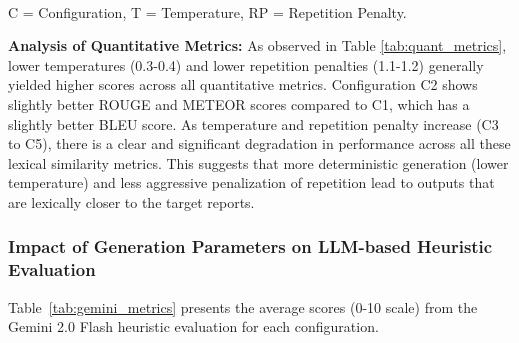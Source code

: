 \documentclass[fleqn,moreauthors,10pt]{ds_report}
\begin{document}
\begin{table*}[!tbp]
\centering
\caption{Average Quantitative Metrics for Different Generation Configurations}
\label{tab:quant_metrics}
\footnotesize{\\C = Configuration, T = Temperature, RP = Repetition Penalty.}
\end{table*}

\textbf{Analysis of Quantitative Metrics:}
As observed in Table \ref{tab:quant_metrics}, lower temperatures (0.3-0.4) and lower repetition penalties (1.1-1.2) generally yielded higher scores across all quantitative metrics. Configuration C2 shows slightly better ROUGE and METEOR scores compared to C1, which has a slightly better BLEU score. As temperature and repetition penalty increase (C3 to C5), there is a clear and significant degradation in performance across all these lexical similarity metrics. This suggests that more deterministic generation (lower temperature) and less aggressive penalization of repetition lead to outputs that are lexically closer to the target reports.

\subsubsection*{Impact of Generation Parameters on LLM-based Heuristic Evaluation}
Table~\ref{tab:gemini_metrics} presents the average scores (0-10 scale) from the Gemini 2.0 Flash heuristic evaluation for each configuration.
\end{document}
